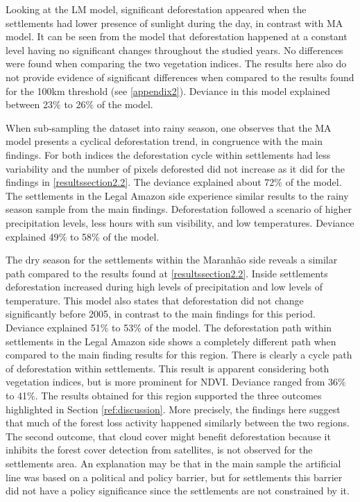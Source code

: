Looking at the LM model, significant deforestation appeared when the settlements had lower presence of sunlight during the day, in contrast with MA model. It can be seen from the model that deforestation happened at a constant level having no significant changes throughout the studied years. No differences were found when comparing the two vegetation indices. The results here also do not provide evidence of significant differences when compared to the results found for the 100km threshold (see \ref{appendix2}). Deviance in this model explained between 23$\%$ to 26$\%$ of the model.

When sub-sampling the dataset into rainy season, one observes that the MA model presents a cyclical deforestation trend, in congruence with the main findings. For both indices the deforestation cycle within settlements had less variability and the number of pixels deforested did not increase as it did for the findings in \ref{resultssection2.2}. The deviance explained about 72$\%$ of the model. The settlements in the Legal Amazon side experience similar results to the rainy season sample from the main findings. Deforestation followed a scenario of higher precipitation levels, less hours with sun visibility, and low temperatures. Deviance explained 49$\%$ to 58$\%$ of the model. 

The dry season for the settlements within the Maranhão side reveals a similar path compared to the results found at \ref{resultssection2.2}. Inside settlements deforestation increased during high levels of precipitation and low levels of temperature. This model also states that deforestation did not change significantly before 2005, in contrast to the main findings for this period. Deviance explained 51$\%$ to 53$\%$ of the model. The deforestation path within settlements in the Legal Amazon side shows a completely different path when compared to the main finding results for this region. There is clearly a cycle path of deforestation within settlements. This result is apparent considering both vegetation indices, but is more prominent for NDVI. Deviance ranged from 36$\%$ to 41$\%$. The results obtained for this region supported the three outcomes highlighted in Section \ref{ref:discussion}. More precisely, the findings here suggest that much of the forest loss activity happened similarly between the two regions. The second outcome, that cloud cover might benefit deforestation because it inhibits the forest cover detection from satellites, is not observed for the settlements area. An explanation may be that in the main sample the artificial line was based on a political and policy barrier, but for settlements this barrier did not have a policy significance since the settlements are not constrained by it. 


